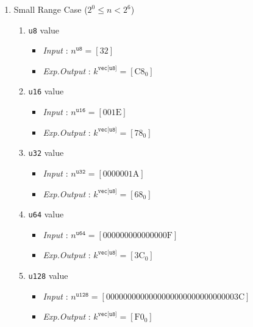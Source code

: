 \documentclass[../alan-handbook.tex]{subfiles}
\begin{document}
\begin{enumerate}
    \item Small Range Case ($2^0 \leq n < 2^6$)
        \begin{enumerate}
            \item \texttt{u8} value
                \begin{itemize}
                    \item \textit{Input} : $n^{\texttt{u8}} = [\text{32}]$
                    \item \textit{Exp.Output} : $k^{\texttt{vec[u8]}} = [\text{C8}_0]$
                \end{itemize}
            \item \texttt{u16} value
                \begin{itemize}
                    \item \textit{Input} : $n^{\texttt{u16}} = [\text{001E}]$ 
                    \item \textit{Exp.Output} : $k^{\texttt{vec[u8]}} = [\text{78}_0]$
                \end{itemize}
            \item \texttt{u32} value
                \begin{itemize}
                    \item \textit{Input} : $n^{\texttt{u32}} = [\text{0000001A}]$
                    \item \textit{Exp.Output} : $k^{\texttt{vec[u8]}} = [\text{68}_0]$
                \end{itemize}
            \item \texttt{u64} value
                \begin{itemize}
                    \item \textit{Input} : $n^{\texttt{u64}} = [\text{000000000000000F}]$
                    \item \textit{Exp.Output} : $k^{\texttt{vec[u8]}} = [\text{3C}_0]$
                \end{itemize}
            \item \texttt{u128} value
                \begin{itemize}
                    \item \textit{Input} : $n^{\texttt{u128}} = [\text{0000000000000000000000000000003C}]$
                    \item \textit{Exp.Output} : $k^{\texttt{vec[u8]}} = [\text{F0}_0]$
                \end{itemize}
        \end{enumerate}

\end{enumerate}
\end{document}
